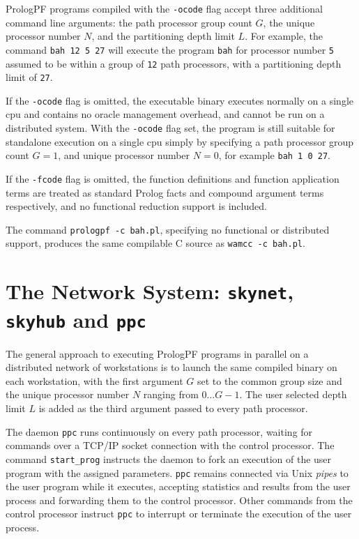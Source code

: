 PrologPF programs compiled with the \texttt{-ocode} flag accept three additional
command line arguments: the path processor group count $G$, the unique processor
number $N$, and the partitioning depth limit $L$.  For example, the command
\texttt{bah 12 5 27} will execute the program \texttt{bah} for processor number
\texttt{5} assumed to be within a group of \texttt{12} path processors, with a
partitioning depth limit of \texttt{27}.

If the \texttt{-ocode} flag is omitted, the executable binary executes normally on
a single cpu and contains no oracle management overhead, and cannot be run on
a distributed system.  With the \texttt{-ocode} flag set, the program is still
suitable for standalone execution on a single cpu simply by specifying a path
processor group count $G=1$, and unique processor number $N=0$, for example
\texttt{bah 1 0 27}.

If the \texttt{-fcode} flag is omitted, the function definitions and function
application terms are treated as standard Prolog facts and compound argument
terms respectively, and no functional reduction support is included.

The command \texttt{prologpf -c bah.pl}, specifying no functional or distributed
support, produces the same compilable C source as \texttt{wamcc -c bah.pl}.

\section{The Network System: \texttt{skynet}, \texttt{skyhub} and \texttt{ppc}} %
\label{skynet}

The general approach to executing PrologPF programs in parallel on a distributed
network of workstations is to launch the same compiled binary on each workstation,
with the first argument $G$ set to the common group size and the unique
processor number $N$ ranging from $0\ldots G-1$.  The user selected depth limit $L$
is added as the third argument passed to every path processor.

The daemon \texttt{ppc} runs continuously on every path processor,
waiting for commands over a TCP/IP socket connection with the control
processor.  The command \texttt{start\_{}prog} instructs the daemon to
fork an execution of the user program with the assigned parameters.
\texttt{ppc} remains connected via Unix \textit{pipes} to the user
program while it executes,  accepting statistics and results from the
user process and forwarding them to the control processor.  Other commands from
the control processor instruct \texttt{ppc} to interrupt or terminate the
execution of the user process.

